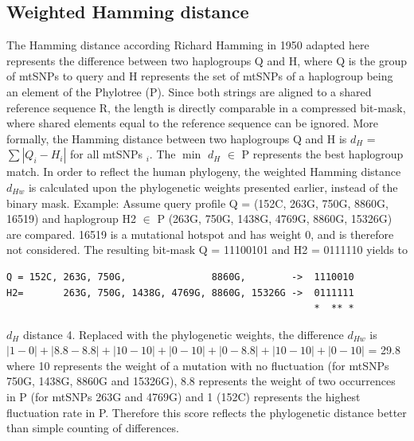 \subsection{Weighted Hamming distance}
\label{hamming}
The Hamming distance according Richard Hamming in 1950 adapted here represents the difference between two haplogroups Q and H, where Q is the group of mtSNPs to query and H represents the set of mtSNPs of a haplogroup being an element of the Phylotree (P). Since both strings are aligned to a shared reference sequence R, the length is directly comparable in a compressed bit-mask, where shared elements equal to the reference sequence can be ignored. More formally, the Hamming distance between two haplogroups Q and H is $d_H$ =  $\sum\left|Q_i-H_i\right|$ for all mtSNPs $_i$. The $\min$ $d_H$ $\in$ P represents the best haplogroup match. In order to reflect the human phylogeny, the weighted Hamming distance $d_{Hw}$ is calculated upon the phylogenetic weights presented earlier, instead of the binary mask.
Example: Assume query profile Q = (152C, 263G, 750G, 8860G, 16519) and haplogroup H2 $\in$ P (263G, 750G, 1438G, 4769G, 8860G, 15326G) are compared. 16519 is a mutational hotspot and has weight 0, and is therefore not considered. The resulting bit-mask Q = 11100101 and H2 = 0111110 yields to 
\begin{verbatim}
Q = 152C, 263G, 750G,               8860G,        ->  1110010
H2=       263G, 750G, 1438G, 4769G, 8860G, 15326G ->  0111111
                                                      *  ** *
\end{verbatim}

$d_{H}$ distance 4. Replaced with the phylogenetic weights, the difference $d_{Hw}$ is $|1-0|+|8.8-8.8|+|10-10|+|0-10|+|0-8.8|+|10-10|+|0-10|$ = 29.8 where 10 represents the weight of a mutation with no fluctuation (for mtSNPs 750G, 1438G, 8860G and 15326G), 8.8 represents the weight of two occurrences in P (for mtSNPs 263G and 4769G) and 1 (152C) represents the highest fluctuation rate in P. Therefore this score reflects the phylogenetic distance better than simple counting of differences.

